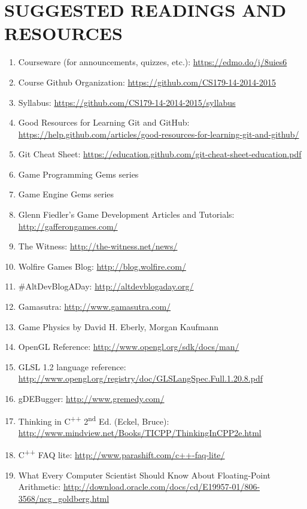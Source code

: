 \documentclass[10pt]{article}
\begin{document}
\section{SUGGESTED READINGS AND RESOURCES}
\begin{enumerate}[noitemsep]
\item Courseware (for announcements, quizzes, etc.): \url{https://edmo.do/j/8uies6}
\item Course Github Organization: \url{https://github.com/CS179-14-2014-2015}
\item Syllabus: \url{https://github.com/CS179-14-2014-2015/syllabus}
\item Good Resources for Learning Git and GitHub: \url{https://help.github.com/articles/good-resources-for-learning-git-and-github/}
\item Git Cheat Sheet: \url{https://education.github.com/git-cheat-sheet-education.pdf}
\item Game Programming Gems series
\item Game Engine Gems series
\item Glenn Fiedler's Game Development Articles and Tutorials: \url{http://gafferongames.com/}
\item The Witness: \url{http://the-witness.net/news/}
\item Wolfire Games Blog: \url{http://blog.wolfire.com/}
\item \#AltDevBlogADay: \url{http://altdevblogaday.org/}
\item Gamasutra: \url{http://www.gamasutra.com/}
\item Game Physics by David H. Eberly, Morgan Kaufmann
\item OpenGL Reference: \url{http://www.opengl.org/sdk/docs/man/}
\item GLSL 1.2 language reference: \url{http://www.opengl.org/registry/doc/GLSLangSpec.Full.1.20.8.pdf}
\item gDEBugger: \url{http://www.gremedy.com/}
\item Thinking in C\textsuperscript{++} 2\textsuperscript{nd} Ed. (Eckel, Bruce): \\\url{http://www.mindview.net/Books/TICPP/ThinkingInCPP2e.html}
\item C\textsuperscript{++} FAQ lite: \url{http://www.parashift.com/c++-faq-lite/}
\item What Every Computer Scientist Should Know About Floating-Point Arithmetic: \url{http://download.oracle.com/docs/cd/E19957-01/806-3568/ncg_goldberg.html}
\end{enumerate}
\end{document}
